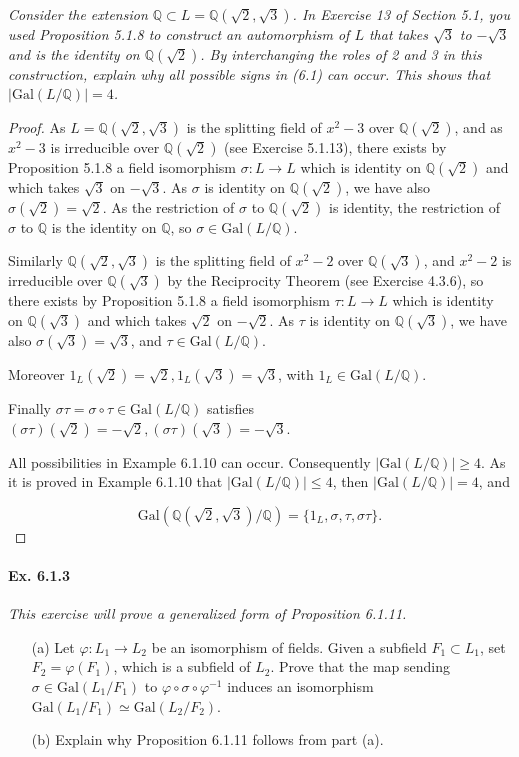 \documentclass[11pt,a4paper]{article}
\newcommand{\Q}{\mathbb{Q}}
\newcommand{\Gal}{\mathrm{Gal}}
\begin{document}
{\it Consider the extension $\Q \subset L = \Q(\sqrt{2},\sqrt{3})$. In Exercise 13 of Section 5.1, you used Proposition 5.1.8 to construct an automorphism of $L$ that takes $\sqrt{3}$ to $-\sqrt{3}$ and is the identity on $\Q(\sqrt{2})$. By interchanging the roles of 2 and 3 in this construction, explain why all possible signs in (6.1) can occur. This shows that $|\Gal(L/\Q)| = 4$.
}

\begin{proof}
As $L = \Q(\sqrt{2},\sqrt{3})$ is the splitting field of $x^2-3$ over $\mathbb{Q}(\sqrt{2})$, and as $x^2 - 3$ is irreducible over $\Q(\sqrt{2})$ (see Exercise 5.1.13), there exists by Proposition 5.1.8 a field isomorphism $\sigma : L\to L$ which is identity on $\Q(\sqrt{2})$ and which takes $\sqrt{3}$ on $-\sqrt{3}$. As $\sigma$ is identity on $\Q(\sqrt{2})$, we have also $\sigma(\sqrt{2}) = \sqrt{2}$. As the restriction of $\sigma$ to $\Q(\sqrt{2})$ is identity, the restriction of $\sigma$ to $\Q$ is the identity on $\Q$, so $\sigma \in \mathrm{Gal}(L/\Q)$.

Similarly $\Q(\sqrt{2},\sqrt{3})$ is the splitting field of $x^2-2$ over $\mathbb{Q}(\sqrt{3})$, and $x^2 - 2$ is irreducible over $\Q(\sqrt{3})$ by the Reciprocity Theorem (see Exercise 4.3.6), so there exists by Proposition 5.1.8 a field isomorphism $\tau : L\to L$ which is identity on $\Q(\sqrt{3})$ and which takes $\sqrt{2}$ on $-\sqrt{2}$. As $\tau$ is identity on  $\Q(\sqrt{3})$, we have also $\sigma(\sqrt{3}) = \sqrt{3}$, and $\tau \in \mathrm{Gal}(L/\Q)$.

Moreover $1_L(\sqrt{2})=\sqrt{2}, 1_L(\sqrt{3})=\sqrt{3}$, with $1_L\in \mathrm{Gal}(L/\Q)$.

Finally $\sigma \tau = \sigma \circ \tau \in \mathrm{Gal}(L/\Q)$ satisfies $(\sigma  \tau) (\sqrt{2}) = -\sqrt{2}, (\sigma  \tau) (\sqrt{3}) = -\sqrt{3}$.

All possibilities in Example 6.1.10 can occur. Consequently $ \vert \mathrm{Gal}(L/\Q) \vert \geq 4$. As it is proved in Example 6.1.10 that $ \vert \mathrm{Gal}(L/\Q) \vert \leq  4$, then $ \vert \mathrm{Gal}(L/\Q) \vert=  4$, and

$$  \mathrm{Gal}(\Q(\sqrt{2},\sqrt{3})/\Q) =\{1_L, \sigma, \tau, \sigma \tau\}.$$
\end{proof}

\paragraph{Ex. 6.1.3}

{\it This exercise will prove a generalized form of Proposition 6.1.11.
\begin{enumerate}
\item[(a)] Let $\varphi:L_1\to L_2$ be an isomorphism of fields. Given a subfield $F_1 \subset L_1$, set $F_2 = \varphi(F_1)$, which is a subfield of $L_2$. Prove that the map sending $\sigma \in \Gal(L_1/F_1)$ to $\varphi \circ \sigma \circ \varphi^{-1}$ induces an isomorphism $\Gal(L_1/F_1) \simeq \Gal(L_2/F_2)$.
\item[(b)] Explain why Proposition 6.1.11 follows from part (a).
\end{enumerate}
}
\end{document}
